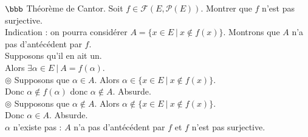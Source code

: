 \documentclass[11pt]{article}
\begin{document}
\vspace*{-0.1cm}

\begin{exercice}{$\bbb$ Théorème de Cantor.}{}
    Soit $f\in\mathcal{F}(E, \mathcal{P}(E))$. Montrer que $f$ n'est pas surjective.\\
    Indication : on pourra considérer $A = \{x \in E ~ | ~ x \notin f(x)\}$.
    \tcblower
    Montrons que $A$ n'a pas d'antécédent par $f$.\\
    Supposons qu'il en ait un.\\
    Alors $\exists \alpha \in E ~ | ~ A = f(\alpha)$.\\
    $\circledcirc$ Supposons que $\alpha \in A$. Alors $\alpha \in \{x \in E ~ | ~ x \notin f(x)\}$.\\
    Donc $\alpha \notin f(\alpha)$ donc $\alpha \notin A$. Absurde.\\[0.15cm]
    $\circledcirc$ Supposons que $\alpha \notin A$. Alors $\alpha \notin \{x \in E ~ | ~ x \notin f(x)\}$.\\
    Donc $\alpha \in A$. Absurde.\\
    $\alpha$ n'existe pas : $A$ n'a pas d'antécédent par $f$ et $f$ n'est pas surjective.
\end{exercice}
\end{document}
